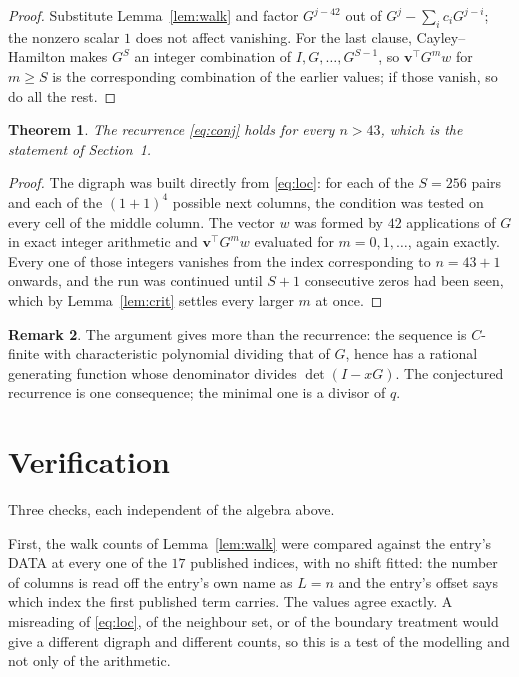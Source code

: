 \documentclass[11pt,a4paper]{article}
\theoremstyle{plain}
\newtheorem{theorem}{Theorem}
\theoremstyle{definition}
\newtheorem{remark}[theorem]{Remark}
\begin{document}
\begin{proof}
Substitute Lemma~\ref{lem:walk} and factor $G^{j-42}$ out of
$G^{j}-\sum_ic_iG^{j-i}$; the nonzero scalar $1$ does not affect
vanishing. For the last clause, Cayley--Hamilton makes $G^{S}$ an integer combination of
$I,G,\dots,G^{S-1}$, so $\mathbf{v}^{\!\top}G^{m}w$ for $m\ge S$ is the corresponding
combination of the earlier values; if those vanish, so do all the rest.
\end{proof}

\begin{theorem}
The recurrence \eqref{eq:conj} holds for every $n>43$, which is the statement of
Section~1.
\end{theorem}

\begin{proof}
The digraph was built directly from \eqref{eq:loc}: for each of the $S=256$ pairs and each
of the $(1+1)^{4}$ possible next columns, the condition was tested on every cell of
the middle column. The vector $w$ was formed by $42$ applications of $G$ in exact integer
arithmetic and $\mathbf{v}^{\!\top}G^{m}w$ evaluated for $m=0,1,\dots$, again exactly.
Every one of those integers vanishes from the index corresponding to $n=43+1$ onwards,
and the run was continued until $S+1$ consecutive zeros had been seen, which by
Lemma~\ref{lem:crit} settles every larger $m$ at once.
\end{proof}

\begin{remark}
The argument gives more than the recurrence: the sequence is $C$-finite with characteristic
polynomial dividing that of $G$, hence has a rational generating function whose denominator
divides $\det(I-xG)$. The conjectured recurrence is one consequence; the minimal one is a
divisor of $q$.
\end{remark}

\section{Verification}

Three checks, each independent of the algebra above.

First, the walk counts of Lemma~\ref{lem:walk} were compared against the entry's DATA at
every one of the $17$ published indices, with no shift fitted: the number of columns is
read off the entry's own name as $L=n$ and the entry's offset says which index the first
published term carries. The values agree exactly. A misreading of \eqref{eq:loc}, of the
neighbour set, or of the boundary treatment would give a different digraph and different
counts, so this is a test of the modelling and not only of the arithmetic.
\end{document}
